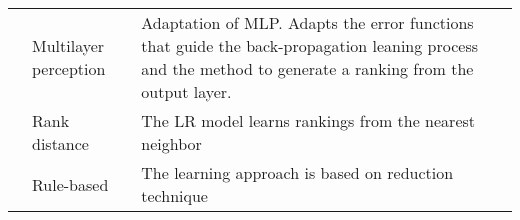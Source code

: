 \documentclass[12pt, a4paper]{article}\usepackage[]{graphicx}\usepackage[]{color}
\begin{document}
\begin{landscape}
\begin{longtable}{p{6cm}p{4cm}p{6cm}p{4cm}}
& Multilayer perception & Adaptation of MLP. Adapts the error functions that guide the back-propagation leaning process and the method to generate a ranking from the output layer.  &\cite{ribeiro2012} \\
&Rank distance & The LR model learns rankings from the nearest neighbor &\cite{brazdil2003}\\
&Rule-based & The learning approach is based on reduction technique&\cite{gurrieri2012} \\
\bottomrule
\end{longtable}
\end{landscape}

\onehalfspacing
%


\end{document}
